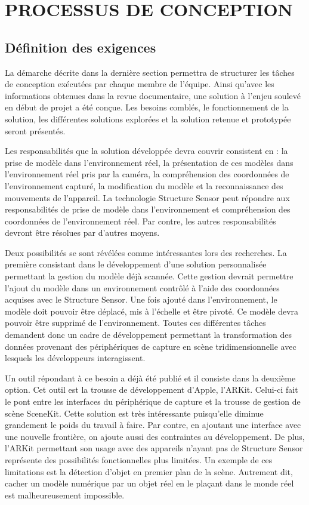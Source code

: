 \documentclass[rapport.tex]{subfiles}
\begin{document}
\chapter*{\uppercase{Processus de conception}}
\section*{Définition des exigences}
La démarche décrite dans la dernière section permettra de structurer les tâches de conception exécutées par chaque membre de l’équipe. Ainsi qu’avec les informations obtenues dans la revue documentaire, une solution à l’enjeu soulevé en début de projet a été conçue. Les besoins comblés, le fonctionnement de la solution, les différentes solutions explorées et la solution retenue et prototypée seront présentés.
\par
Les responsabilités que la solution développée devra couvrir consistent en : la prise de modèle dans l’environnement réel, la présentation de ces modèles dans l’environnement réel pris par la caméra, la compréhension des coordonnées de l’environnement capturé, la modification du modèle et la reconnaissance des mouvements de l’appareil. La technologie Structure Sensor peut répondre aux responsabilités de prise de modèle dans l’environnement et compréhension des coordonnées de l’environnement réel. Par contre, les autres responsabilités devront être résolues par d’autres moyens.
\par
Deux possibilités se sont révélées comme intéressantes lors des recherches. La première consistant dans le développement d’une solution personnalisée permettant la gestion du modèle déjà scannée. Cette gestion devrait permettre l’ajout du modèle dans un environnement contrôlé à l’aide des coordonnées acquises avec le Structure Sensor. Une fois ajouté dans l’environnement, le modèle doit pouvoir être déplacé, mis à l’échelle et être pivoté. Ce modèle devra pouvoir être supprimé de l’environnement. Toutes ces différentes tâches demandent donc un cadre de développement permettant la transformation des données provenant des périphériques de capture en scène tridimensionnelle avec lesquels les développeurs interagissent.
\par
Un outil répondant à ce besoin a déjà été publié et il consiste dans la deuxième option. Cet outil est la trousse de développement d’Apple, l’ARKit. Celui-ci fait le pont entre les interfaces du périphérique de capture et la trousse de gestion de scène SceneKit. Cette solution est très intéressante puisqu’elle diminue grandement le poids du travail à faire. Par contre, en ajoutant une interface avec une nouvelle frontière, on ajoute aussi des contraintes au développement. De plus, l’ARKit permettant son usage avec des appareils n’ayant pas de Structure Sensor représente des possibilités fonctionnelles plus limitées. Un exemple de ces limitations est la détection d’objet en premier plan de la scène. Autrement dit, cacher un modèle numérique par un objet réel en le plaçant dans le monde réel est malheureusement impossible.
\end{document}
